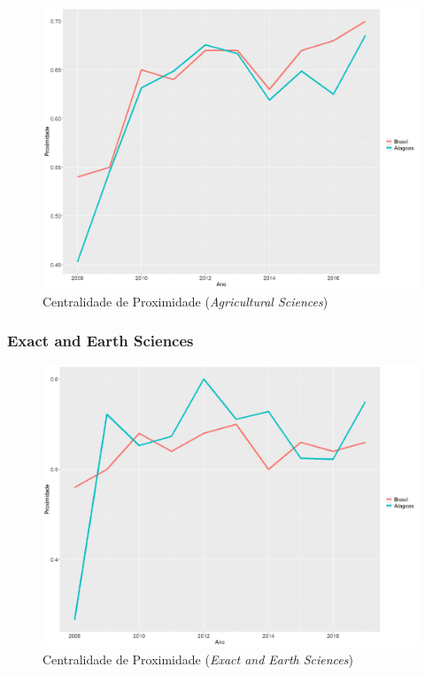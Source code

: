 \begin{figure}[H]
	\centering
	\includegraphics[scale=0.4]{Imagens/agricultural/graf-linha-closeness-br-al.pdf}
	\caption{Centralidade de Proximidade (\textit{Agricultural Sciences})}
	\label{close-agri-1}
\end{figure}

\subsubsection{Exact and Earth Sciences}

\begin{figure}[H]
	\centering
	\includegraphics[scale=0.4]{Imagens/exact/graf-linha-closeness-br-al.pdf}
	\caption{Centralidade de Proximidade (\textit{Exact and Earth Sciences})}
	\label{close-exact-1}
\end{figure}

